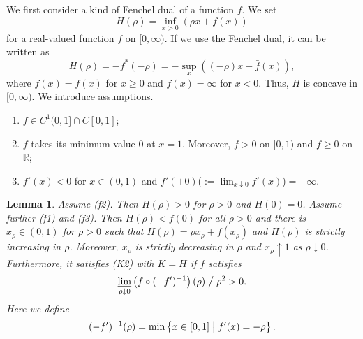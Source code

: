 \documentclass[11pt]{amsart} %
\numberwithin{equation}{section}
\newtheorem{lem}[thm]{Lemma}
\begin{document}
We first consider a kind of Fenchel dual of a function $f$.
 We set
\begin{equation} \label{EHdef}
	H(\rho) = \inf_{x>0} \left(\rho x + f(x) \right)
\end{equation}
for a real-valued function $f$ on $[0,\infty)$.
 If we use the Fenchel dual, it can be written as
\[
	H(\rho) = -f^*(-\rho) = - \sup_x\left((-\rho)x - \bar{f}(x) \right),
\]
where $\bar{f}(x)=f(x)$ for $x\geq0$ and $\bar{f}(x)=\infty$ for $x<0$.
 Thus, $H$ is concave in $[0,\infty)$.
 We introduce assumptions.
\begin{enumerate}
\item[(f1)] $f\in C^1(0,1]\cap C[0,1]$;
\item[(f2)] $f$ takes its minimum value $0$ at $x=1$.
 Moreover, $f>0$ on $[0,1)$ and $f\ge0$ on $\mathbb{R}$;
\item[(f3)] $f'(x)<0$ for $x\in(0,1)$ and $f'(+0)$($:=\lim_{x\downarrow0}f'(x)$)$=-\infty$.
\end{enumerate}
%
\begin{lem} \label{LK2}
Assume (f2).
 Then $H(\rho)>0$ for $\rho>0$ and $H(0)=0$.
 Assume further (f1) and (f3).
 Then $H(\rho)<f(0)$ for all $\rho>0$ and there is $x_\rho\in(0,1)$ for $\rho>0$ such that $H(\rho)=\rho x_\rho+f(x_\rho)$ and $H(\rho)$ is strictly increasing in $\rho$.
 Moreover, $x_\rho$ is strictly decreasing in $\rho$ and $x_\rho\uparrow 1$ as $\rho\downarrow0$.
 Furthermore, it satisfies (K2) with $K=H$ if $f$ satisfies
\begin{equation} \label{EHC}
	\varliminf_{\rho\downarrow0} \left(f\circ(-f')^{-1}\right) (\rho) \bigm/ \rho^2 > 0.
\end{equation}
Here we define
\[
	(-f')^{-1}(\rho) = \min \left\{ x \in [0,1] \bigm|
	f'(x) = -\rho \right\}.
\] 
\end{lem}
\end{document}
